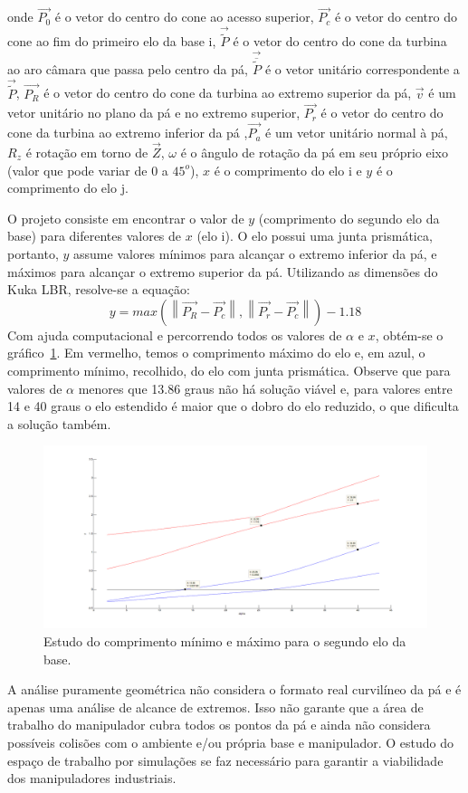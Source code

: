 onde $\overrightarrow{P_0}$ é o vetor do centro do cone ao acesso superior,
$\overrightarrow{P_c}$ é o vetor do centro do cone ao fim do primeiro elo da
base i, $\overrightarrow{\widetilde{P}}$ é o vetor do centro do cone da turbina
ao aro câmara que passa pelo centro da pá,
$\overrightarrow{\overline{\widetilde{P}}}$ é o vetor unitário correspondente a
$\overrightarrow{\widetilde{P}}$, $\overrightarrow{P_R}$ é o vetor do centro do cone da turbina
ao extremo superior da pá, $\overrightarrow{v}$ é um vetor unitário no plano da
pá e no extremo superior, $\overrightarrow{P_r}$ é o vetor do centro do cone da
turbina ao extremo inferior da pá ,$\overrightarrow{P_a}$ é um vetor unitário
normal à pá, $R_z$ é rotação em torno de $\overrightarrow{Z}$, $\omega$ é o
ângulo de rotação da pá em seu próprio eixo (valor que pode variar de $0$ a
$45^o$), $x$ é o comprimento do elo i e $y$ é o comprimento do elo j.

O projeto consiste em encontrar o valor de $y$ (comprimento do segundo elo da
base) para diferentes valores de $x$ (elo i). O elo possui uma junta
prismática, portanto, $y$ assume valores mínimos para alcançar o extremo
inferior da pá, e máximos para alcançar o extremo superior da pá.
Utilizando as dimensões do Kuka LBR, resolve-se a equação: 
$$y = max (\left \|
\overrightarrow{P_R}-\overrightarrow{P_c} \right \|, \left \|
\overrightarrow{P_r}-\overrightarrow{P_c} \right \|) - 1.18$$ 
Com ajuda
computacional e percorrendo todos os valores de  $\alpha$ e $x$, obtém-se o
gráfico~\ref{yminsmallhatch}. Em vermelho, temos o comprimento máximo do elo e,
em azul, o comprimento mínimo, recolhido, do elo com junta prismática. Observe
que para valores de $\alpha$ menores que 13.86 graus não há solução viável e,
para valores entre 14 e 40 graus o elo estendido é maior que o dobro do elo
reduzido, o que dificulta a solução também.

\begin{figure}[h!]
\centering
	\includegraphics[width=\columnwidth]{figs/estudo/geometrico/yminsmallhatch.png} 
	\caption{Estudo do comprimento mínimo e máximo para o segundo elo da base.}
	\label{yminsmallhatch}
\end{figure}

A análise puramente geométrica não considera o formato real curvilíneo da pá e
é apenas uma análise de alcance de extremos. Isso não garante que a área de
trabalho do manipulador cubra todos os pontos da pá e ainda não considera
possíveis colisões com o ambiente e/ou própria base e manipulador. O estudo do
espaço de trabalho por simulações se faz necessário para garantir a viabilidade
dos manipuladores industriais.